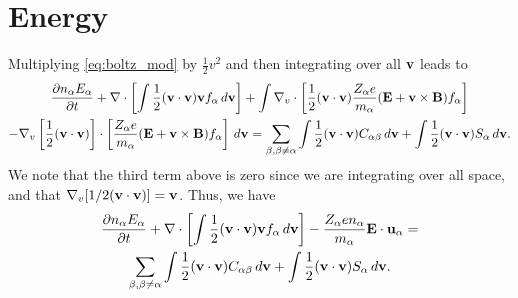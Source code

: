 \documentclass[a4paper,11pt]{report}
\begin{document}
\section{Energy}
Multiplying \cref{eq:boltz_mod} by $\frac{1}{2} v^2$ and then integrating over all $\mathbf{v}$ leads to
\begin{multline}
\label{eq:energy_derv_1}
\frac{\partial n_\alpha E_\alpha}{\partial t} + \nabla \cdot \left [ \int \frac{1}{2} (\mathbf{v} \cdot \mathbf{v}) \mathbf{v} f_\alpha \, d\mathbf{v} \right ] + \int \nabla_v \cdot \left [ \frac{1}{2} (\mathbf{v} \cdot \mathbf{v}) \frac{Z_\alpha e}{m_\alpha} ( \mathbf{E} + \mathbf{v} \times \mathbf{B} ) f_\alpha \right ] \\
- \nabla_v \left [ \frac{1}{2} (\mathbf{v} \cdot \mathbf{v}) \right ] \cdot \left [ \frac{Z_\alpha e}{m_\alpha} ( \mathbf{E} + \mathbf{v} \times \mathbf{B} ) f_\alpha \right ] \, d\mathbf{v} = \sum_{\beta, \beta \ne \alpha} \int \frac{1}{2} (\mathbf{v} \cdot \mathbf{v}) C_{\alpha \beta} \, d\mathbf{v} + \int \frac{1}{2} (\mathbf{v} \cdot \mathbf{v}) S_\alpha \, d\mathbf{v}.
\end{multline}
We note that the third term above is zero since we are integrating over all space, and that $\nabla_v [ 1/2 (\mathbf{v} \cdot \mathbf{v} ) ] = \mathbf{v}$. Thus, we have
\begin{multline}
\label{eq:energy_derv_2}
\frac{\partial n_\alpha E_\alpha}{\partial t} + \nabla \cdot \left [ \int \frac{1}{2} (\mathbf{v} \cdot \mathbf{v}) \mathbf{v} f_\alpha \, d\mathbf{v} \right ] - \frac{Z_\alpha e n_\alpha}{m_\alpha} \mathbf{E} \cdot \mathbf{u}_\alpha =\\
\sum_{\beta, \beta \ne \alpha} \int \frac{1}{2} (\mathbf{v} \cdot \mathbf{v}) C_{\alpha \beta} \, d\mathbf{v} + \int \frac{1}{2} (\mathbf{v} \cdot \mathbf{v}) S_\alpha \, d\mathbf{v}.
\end{multline}
\end{document}
